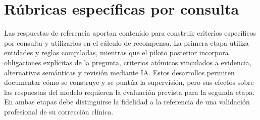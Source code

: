 \section{Rúbricas específicas por consulta}
\label{sec:contribuciones-rubricas}
Las respuestas de referencia aportan contenido para construir criterios específicos por consulta y utilizarlos en el cálculo de recompensa. La primera etapa utiliza entidades y reglas compiladas, mientras que el piloto posterior incorpora obligaciones explícitas de la pregunta, criterios atómicos vinculados a evidencia, alternativas semánticas y revisión mediante IA. Estos desarrollos permiten documentar cómo se construye y se puntúa la supervisión, pero sus efectos sobre las respuestas del modelo requieren la evaluación prevista para la segunda etapa. En ambas etapas debe distinguirse la fidelidad a la referencia de una validación profesional de su corrección clínica.
